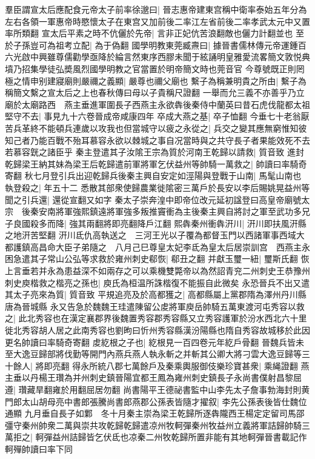 羣臣謂宣太后應配食元帝太子前率徐邈曰|{
	晉志惠帝建東宫稱中衛率泰始五年分為左右各領一軍惠帝時愍懷太子在東宫又加前後二率江左省前後二率孝武太元中又置率所類翻}
宣太后平素之時不伉儷於先帝|{
	言非正妃伉苦浪翻敵也儷力計翻並也}
至於子孫豈可為祖考立配|{
	為于偽翻}
國學明教東莞臧燾曰|{
	據晉書儒林傳元帝運鍾百六光啟中興雖尊儒勸學亟降於綸言然東序西膠未聞于絃誦明皇雅愛流畧簡文敦悦典墳乃招集學徒弘奬風烈國學明教之官當置於明帝簡文時也莞音官}
今尊號既正則罔極之情申别建寢廟則嚴禰之義顯|{
	嚴尊也禰父廟也}
繫子為稱兼明貴之所由|{
	繫子為稱簡文繫之宣太后之上也春秋傳曰母以子貴稱尺證翻}
一舉而允三義不亦善乎乃立廟於太廟路西　燕主垂進軍圍長子西燕主永欲犇後秦侍中蘭英曰昔石虎伐龍都太祖堅守不去|{
	事見九十六卷晉成帝咸康四年}
卒成大燕之基|{
	卒子恤翻}
今垂七十老翁厭苦兵革終不能頓兵連歲以攻我也但當城守以疲之永從之|{
	兵交之變其應無窮惟知彼知己者乃能百戰不殆耳慕容永欲以棘城之事自况當時與之共守長子者果能效死不去若慕容皝之諸臣乎}
秦主登遣其子汝隂王宗為質於河南王乾歸以請救|{
	質音致}
進封乾歸梁王納其妹為梁王后乾歸遣前軍將軍乞伏益州等帥騎一萬救之|{
	帥讀曰率騎奇寄翻}
秋七月登引兵出迎乾歸兵後秦主興自安定如涇陽與登戰于山南|{
	馬髦山南也}
執登殺之|{
	年五十二}
悉散其部衆使歸農業徙隂密三萬戶於長安以李后賜姚晃益州等聞之引兵還|{
	還從宣翻又如字}
秦太子崇奔湟中即帝位改元延初諡登曰高皇帝廟號太宗　後秦安南將軍強熙鎮遠將軍強多叛推竇衝為主後秦主興自將討之軍至武功多兄子良國殺多而降|{
	強其兩翻將即亮翻降戶江翻}
熙犇秦州衝犇汧川|{
	汧川即扶風汧縣之地汧苦堅翻}
汧川氐仇高執送之　三河王光以子覆為都督玉門以西諸軍事西域大都護鎮高昌命大臣子弟隨之　八月己巳尊皇太妃李氐為皇太后居崇訓宫　西燕主永困急遣其子常山公弘等求救於雍州刺史郗恢|{
	郗丑之翻}
并獻玉璽一紐|{
	璽斯氏翻}
恢上言垂若并永為患益深不如兩存之可以乘機雙斃帝以為然詔青兖二州刺史王恭豫州刺史庾楷救之楷亮之孫也|{
	庾氏為桓温所誅楷復不能振自此微矣}
永恐晉兵不出又遣其太子亮來為質|{
	質音致}
平規追亮及於高都獲之|{
	高都縣屬上黨郡隋為澤州丹川縣唐為晉城縣}
永又告急於魏魏王珪遣陳留公䖍將軍庾岳帥騎五萬東渡河屯秀容以救之|{
	此北秀容也在漢定襄郡界後魏置秀容郡秀容縣又立秀容護軍於汾水西北六十里徙北秀容胡人居之此南秀容也劉昫曰忻州秀容縣漢汾陽縣也隋自秀容故城移於此因更名帥讀曰率騎奇寄翻}
䖍紇根之子也|{
	紇根見一百四卷元年紇戶骨翻}
晉魏兵皆未至大逸豆歸部將伐勤等開門內燕兵燕人執永斬之并斬其公卿大將刁雲大逸豆歸等三十餘人|{
	將即亮翻}
得永所統八郡七萬餘戶及秦乘輿服御伎樂珍寶甚衆|{
	乘䋲證翻}
燕主垂以丹楊王瓚為并州刺史鎮晉陽宜都王鳳為雍州刺史鎮長子永尚書僕射昌黎屈遵|{
	瓚藏旱翻雍於用翻屈居勿翻}
尚書陽平王德祕書監中山李先太子詹事勃海封則黄門郎太山胡母亮中書郎張騰尚書郎燕郡公孫表皆隨才擢叙|{
	李先公孫表後皆仕魏位通顯}
九月垂自長子如鄴　冬十月秦主崇為梁王乾歸所逐犇隴西王楊定定留司馬邵彊守秦州帥衆二萬與崇共攻乾歸乾歸遣凉州牧軻彈秦州牧益州立義將軍詰歸帥騎三萬拒之|{
	軻彈益州詰歸皆乞伏氐也凉秦二州牧乾歸所置非能有其地軻彈晉書載記作軻殫帥讀曰率下同}

